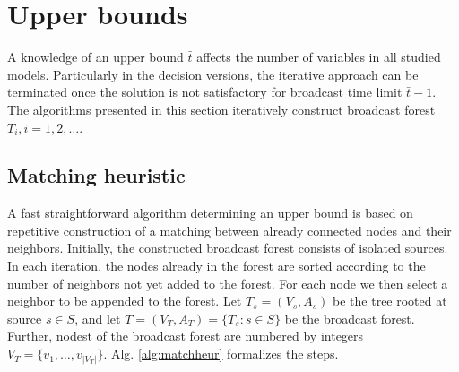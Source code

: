 \section{Upper bounds}

A knowledge of an upper bound $\bar{t}$ affects the number of variables in all studied models. 
Particularly in the decision versions, the iterative approach can be terminated once the solution is not satisfactory for broadcast time limit $\bar{t}-1$.
The algorithms presented in this section iteratively construct broadcast forest $T_i, i=1,2,\dots$.
\subsection{Matching heuristic}

A fast straightforward algorithm determining an upper bound is based on repetitive construction of a matching between already connected nodes and their neighbors.
Initially, the constructed broadcast forest consists of isolated sources. 
In each iteration, the nodes already in the forest are sorted according to the number of neighbors not yet added to the forest.
For each node we then select a neighbor to be appended to the forest.
Let $T_s=(V_s,A_s)$ be the tree rooted at source $s\in S$, and let $T=(V_T, A_T)=\{T_s:s\in S\}$ be the broadcast forest.
Further, nodest of the broadcast forest are numbered by integers $V_T=\{v_1,\dots,v_{|V_T|}\}$.
Alg. \ref{alg:matchheur} formalizes the steps.

